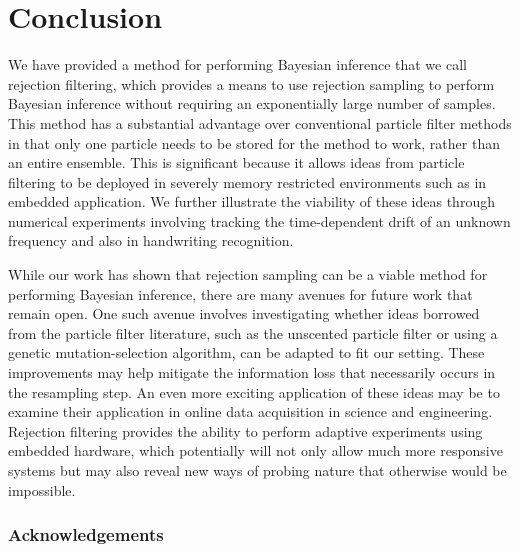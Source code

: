 \documentclass[twoside]{article}
\begin{document}
\section{Conclusion}
We have provided a method for performing Bayesian inference that we call rejection filtering, which provides a means to use
rejection sampling to perform Bayesian inference without requiring an exponentially large number of samples.  This method has a substantial
advantage over conventional particle filter methods in that only one particle needs to be stored for the method to work, rather
than an entire ensemble.  This is significant because it allows ideas from particle filtering to be deployed in severely memory restricted
environments such as in embedded application.  We further illustrate the viability of these ideas through numerical experiments
involving tracking the time-dependent drift of an unknown frequency and also in handwriting recognition.

While our work has shown that rejection sampling can be a viable method for performing Bayesian inference, there are many
avenues for future work that remain open.  One such avenue involves investigating whether ideas borrowed from the particle
filter literature, such as the unscented particle filter or using a genetic mutation-selection algorithm, can be adapted to fit our setting.
  These improvements may help mitigate the information loss that necessarily occurs in the resampling step.  An even more exciting
application of these ideas may be to examine their application in online data acquisition in science and engineering.  Rejection
filtering provides the ability to perform adaptive experiments using embedded hardware, which potentially will not only allow
much more responsive systems but may also reveal new ways of probing nature that otherwise would be impossible.
\label{sec:conclusions}





\appendix

\subsubsection*{Acknowledgements}
\end{document}
